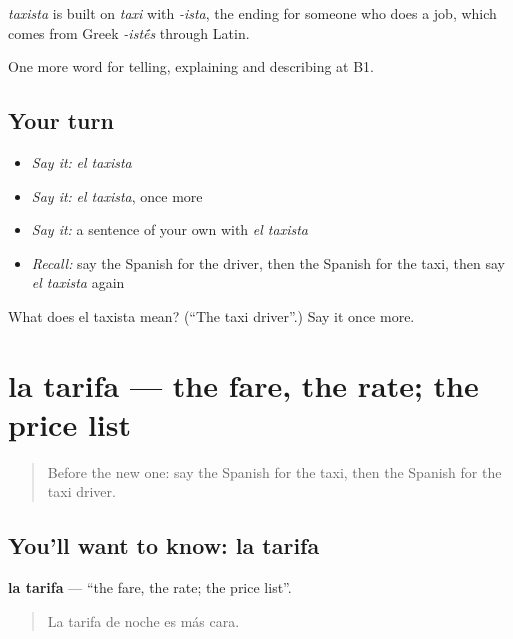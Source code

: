 \begin{cousinweb}
\emph{taxista} is built on \emph{taxi} with \emph{-ista}, the ending for someone who does a job, which comes from Greek \emph{-ist\'{\={e}}s} through Latin.
\end{cousinweb}

\begin{grammarlens}[title={What you've built}]
One more word for telling, explaining and describing at B1.
\end{grammarlens}

\subsection*{Your turn}
\begin{itemize}
\raggedright
  \item \emph{Say it:} \emph{el taxista}
  \item \emph{Say it:} \emph{el taxista}, once more
  \item \emph{Say it:} a sentence of your own with \emph{el taxista}
  \item \emph{Recall:} say the Spanish for the driver, then the Spanish for the taxi, then say \emph{el taxista} again
\end{itemize}

\begin{tcolorbox}[breakable,colback=teal!4,colframe=teal!35!black,title={Before you move on}]
What does el taxista mean? (\textquotedblleft{}The taxi driver\textquotedblright{}.) Say it once more.
\end{tcolorbox}
\section[la tarifa]{la tarifa — the fare, the rate; the price list}

\label{lesson:ES-C641-tarifa}



\begin{quote}
Before the new one: say the Spanish for the taxi, then the Spanish for the taxi driver.
\end{quote}

\subsection*{You'll want to know: la tarifa}
\textbf{la tarifa} — \textquotedblleft{}the fare, the rate; the price list\textquotedblright{}.

\begin{quote}
La tarifa de noche es más cara.
\end{quote}

